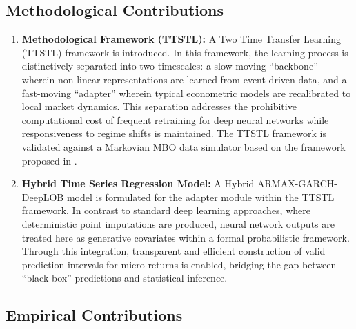 \documentclass[10pt,a4paper,oneside]{article}
\begin{document}
\subsection{Methodological Contributions}

\begin{enumerate}
    \item \textbf{Methodological Framework (TTSTL):} A Two Time Transfer Learning (TTSTL) framework is introduced. In this framework, the learning process is distinctively separated into two timescales: a slow-moving ``backbone'' wherein non-linear representations are learned from event-driven data, and a fast-moving ``adapter'' wherein typical econometric models are recalibrated to local market dynamics. This separation addresses the prohibitive computational cost of frequent retraining for deep neural networks while responsiveness to regime shifts is maintained. The TTSTL framework is validated against a Markovian MBO data simulator based on the framework proposed in \cite{cont2023mathematical}.

    \item \textbf{Hybrid Time Series Regression Model:} A Hybrid ARMAX-GARCH-DeepLOB model is formulated for the adapter module within the TTSTL framework. In contrast to standard deep learning approaches, where deterministic point imputations are produced, neural network outputs are treated here as generative covariates within a formal probabilistic framework. Through this integration, transparent and efficient construction of valid prediction intervals for micro-returns is enabled, bridging the gap between ``black-box'' predictions and statistical inference.
\end{enumerate}

\subsection{Empirical Contributions}
\end{document}
